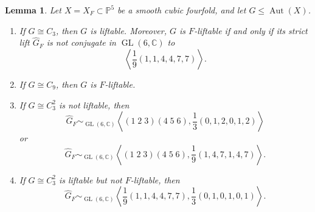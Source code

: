\documentclass[12pt]{amsart}
\numberwithin{equation}{section}
\theoremstyle{plain}
\newtheorem{lem}[thm]{Lemma}
\theoremstyle{definition}
\theoremstyle{remark}
\newcommand{\CC}{\mathbb C}
\newcommand{\PP}{\mathbb P}
\DeclareMathOperator{\Aut}{Aut}
\DeclareMathOperator{\GL}{GL}
\begin{document}
\begin{lem}\label{lem:small-3-groups-lifting}
Let $X=X_F\subset\PP^5$ be a smooth cubic fourfold,
and let $G\leq\Aut(X)$.
\begin{enumerate}

    \item If $G\cong C_3$, then $G$ is liftable.  Moreover, $G$ is $F$-liftable
    if and only if its strict lift $\widehat G_F$ is not conjugate in
    $\GL(6,\CC)$ to
    \[
    \left\langle
    \frac19(1,1,4,4,7,7)
    \right\rangle.
    \]

    \item If $G\cong C_9$, then $G$ is $F$-liftable.

    \item If $G\cong C_3^2$ is not liftable, then
    \[
    \widehat G_F
    \sim_{\GL(6,\CC)}
    \left\langle
    (1\;2\;3)(4\;5\;6),
    \frac13(0,1,2,0,1,2)
    \right\rangle
    \]
    or
    \[
    \widehat G_F
    \sim_{\GL(6,\CC)}
    \left\langle
    (1\;2\;3)(4\;5\;6),
    \frac19(1,4,7,1,4,7)
    \right\rangle.
    \]

    \item If $G\cong C_3^2$ is liftable but not $F$-liftable, then
    \[
    \widehat G_F\sim_{\GL(6,\CC)}
    \left\langle
    \frac19(1,1,4,4,7,7),
    \frac13(0,1,0,1,0,1)
    \right\rangle.
    \]
\end{enumerate}
\end{lem}
\end{document}
